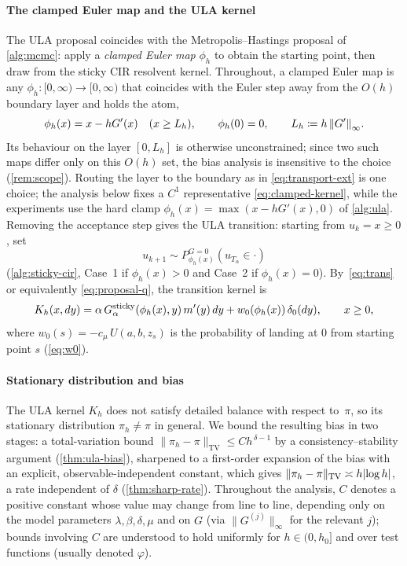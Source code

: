 \documentclass[aap,preprint]{imsart}
\DeclarePairedDelimiter{\Vpair}{\|}{\|} %
\DeclarePairedDelimiter{\vpair}{|}{|} %
\newcommand\norm[2][0pt]{\Vpair*{#2}} %
\newcommand\snorm[1]{\norm{\smash{#1}}} %
\newcommand\abs[2][0pt]{\vpair*{#2}} %
\numberwithin{equation}{section}
\theoremstyle{plain}
\theoremstyle{definition}
\begin{document}
\paragraph{The clamped Euler map and the ULA kernel}
The ULA proposal coincides with the Metropolis--Hastings proposal of \cref{alg:mcmc}: apply a \emph{clamped Euler map} $\phi_h$ to obtain the starting point, then draw from the sticky CIR resolvent kernel.  Throughout, a clamped Euler map is any $\phi_h\colon[0,\infty)\to[0,\infty)$ that coincides with the Euler step away from the $O(h)$ boundary layer and holds the atom,
\begin{equation}\label{eq:clamped-general}
  \phi_h(x)=x-hG'(x)\quad (x\ge L_h),\qquad \phi_h(0)=0,\qquad L_h\coloneqq h\,\snorm{G'}_\infty .
\end{equation}
Its behaviour on the layer $[0,L_h]$ is otherwise unconstrained; since two such maps differ only on this $O(h)$ set, the bias analysis is insensitive to the choice (\cref{rem:scope}).  Routing the layer to the boundary as in \eqref{eq:transport-ext} is one choice; the analysis below fixes a $C^1$ representative \eqref{eq:clamped-kernel}, while the experiments use the hard clamp $\phi_h(x)=\max(x-hG'(x),0)$ of \cref{alg:ula}.  Removing the acceptance step gives the ULA transition: starting from $u_k = x \ge 0$, set
\[
  u_{k+1} \sim P_{\phi_h(x)}^{G=0}(u_{T_\alpha} \in \cdot)
\]
(\cref{alg:sticky-cir}, Case~1 if $\phi_h(x) > 0$ and Case~2 if $\phi_h(x) = 0$). By~\cref{eq:trans} or equivalently \cref{eq:proposal-q}, the transition kernel is
\begin{equation}\label{eq:ula-kernel}
  K_h(x, dy)
  = \alpha\,G^{\rm sticky}_\alpha(\phi_h(x),y)\,m'(y)\,dy
  + w_0(\phi_h(x))\,\delta_0(dy), \qquad x \geq 0,
\end{equation}
where $w_0(s) = -c_\mu\,U(a,b,z_s)$ is the probability of landing at $0$ from starting point $s$ (\cref{eq:w0}).


\paragraph{Stationary distribution and bias}
The ULA kernel $K_h$ does not satisfy detailed balance with respect
to~$\pi$, so its stationary distribution $\pi_h \neq \pi$ in general.  We bound the resulting bias in two stages: a total-variation bound $\|\pi_h-\pi\|_{\mathrm{TV}}\le Ch^{\,\delta-1}$ by a consistency--stability argument (\cref{thm:ula-bias}), sharpened to a first-order expansion of the bias with an explicit, observable-independent constant, which gives $\|\pi_h-\pi\|_{\mathrm{TV}}\asymp h\abs{\log h }$, a rate independent of $\delta$ (\cref{thm:sharp-rate}).  
Throughout the analysis, $C$ denotes a positive constant whose value may change from line to line, depending only on the model parameters $\lambda, \beta, \delta, \mu$ and on $G$ (via $\|G^{(j)}\|_\infty$ for the relevant $j$); bounds involving $C$ are understood to hold uniformly for $h \in (0, h_0]$  and over test functions (usually denoted $\varphi$).
\end{document}
